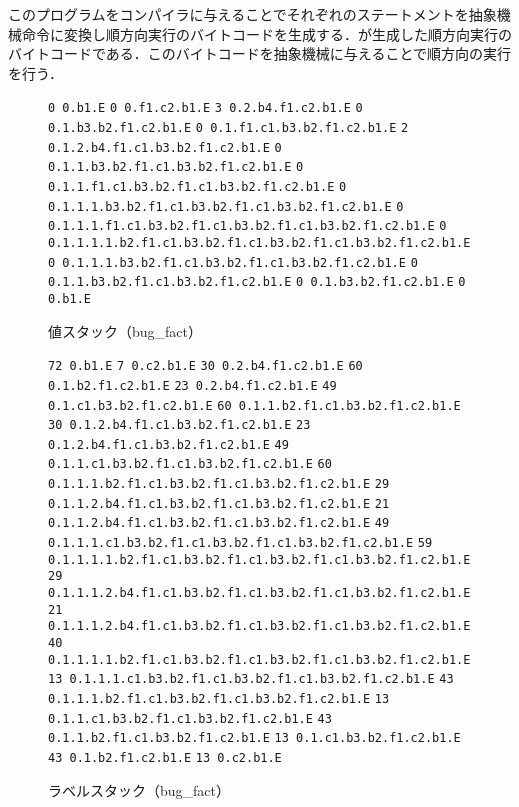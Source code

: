 \documentclass[submit,PRO]{ipsj}
\def\|{\verb|}
\begin{document}
このプログラムをコンパイラに与えることでそれぞれのステートメントを抽象機械命令に変換し順方向実行のバイトコードを生成する．が生成した順方向実行のバイトコードである．このバイトコードを抽象機械に与えることで順方向の実行を行う．

\begin{figure}[tb]
\vbox{
\hbox{\|0 0.b1.E|}
\hbox{\|0 0.f1.c2.b1.E|}
\hbox{\|3 0.2.b4.f1.c2.b1.E|}
\hbox{\|0 0.1.b3.b2.f1.c2.b1.E|}
\hbox{\|0 0.1.f1.c1.b3.b2.f1.c2.b1.E|}
\hbox{\|2 0.1.2.b4.f1.c1.b3.b2.f1.c2.b1.E|}
\hbox{\|0 0.1.1.b3.b2.f1.c1.b3.b2.f1.c2.b1.E|}
\hbox{\|0 0.1.1.f1.c1.b3.b2.f1.c1.b3.b2.f1.c2.b1.E|}
\hbox{\|0 0.1.1.1.b3.b2.f1.c1.b3.b2.f1.c1.b3.b2.f1.c2.b1.E|}
\hbox{\|0 0.1.1.1.f1.c1.b3.b2.f1.c1.b3.b2.f1.c1.b3.b2.f1.c2.b1.E|}
\hbox{\|0 0.1.1.1.1.b2.f1.c1.b3.b2.f1.c1.b3.b2.f1.c1.b3.b2.f1.c2.b1.E|}
\hbox{\|0 0.1.1.1.b3.b2.f1.c1.b3.b2.f1.c1.b3.b2.f1.c2.b1.E|}
\hbox{\|0 0.1.1.b3.b2.f1.c1.b3.b2.f1.c2.b1.E|}
\hbox{\|0 0.1.b3.b2.f1.c2.b1.E|}
\hbox{\|0 0.b1.E|}
}
\centerline{}
\caption{値スタック（bug\_fact）}
\label{fig:value}
\end{figure}

\begin{figure}[tb]
\vbox{
\hbox{\|72 0.b1.E|}
\hbox{\|7 0.c2.b1.E|}
\hbox{\|30 0.2.b4.f1.c2.b1.E|}
\hbox{\|60 0.1.b2.f1.c2.b1.E|}
\hbox{\|23 0.2.b4.f1.c2.b1.E|}
\hbox{\|49 0.1.c1.b3.b2.f1.c2.b1.E|}
\hbox{\|60 0.1.1.b2.f1.c1.b3.b2.f1.c2.b1.E|}
\hbox{\|30 0.1.2.b4.f1.c1.b3.b2.f1.c2.b1.E|}
\hbox{\|23 0.1.2.b4.f1.c1.b3.b2.f1.c2.b1.E|}
\hbox{\|49 0.1.1.c1.b3.b2.f1.c1.b3.b2.f1.c2.b1.E|}
\hbox{\|60 0.1.1.1.b2.f1.c1.b3.b2.f1.c1.b3.b2.f1.c2.b1.E|}
\hbox{\|29 0.1.1.2.b4.f1.c1.b3.b2.f1.c1.b3.b2.f1.c2.b1.E|}
\hbox{\|21 0.1.1.2.b4.f1.c1.b3.b2.f1.c1.b3.b2.f1.c2.b1.E|}
\hbox{\|49 0.1.1.1.c1.b3.b2.f1.c1.b3.b2.f1.c1.b3.b2.f1.c2.b1.E|}
\hbox{\|59 0.1.1.1.1.b2.f1.c1.b3.b2.f1.c1.b3.b2.f1.c1.b3.b2.f1.c2.b1.E|}
\hbox{\|29 0.1.1.1.2.b4.f1.c1.b3.b2.f1.c1.b3.b2.f1.c1.b3.b2.f1.c2.b1.E|}
\hbox{\|21 0.1.1.1.2.b4.f1.c1.b3.b2.f1.c1.b3.b2.f1.c1.b3.b2.f1.c2.b1.E|}
\hbox{\|40 0.1.1.1.1.b2.f1.c1.b3.b2.f1.c1.b3.b2.f1.c1.b3.b2.f1.c2.b1.E|}
\hbox{\|13 0.1.1.1.c1.b3.b2.f1.c1.b3.b2.f1.c1.b3.b2.f1.c2.b1.E|}
\hbox{\|43 0.1.1.1.b2.f1.c1.b3.b2.f1.c1.b3.b2.f1.c2.b1.E|}
\hbox{\|13 0.1.1.c1.b3.b2.f1.c1.b3.b2.f1.c2.b1.E|}
\hbox{\|43 0.1.1.b2.f1.c1.b3.b2.f1.c2.b1.E|}
\hbox{\|13 0.1.c1.b3.b2.f1.c2.b1.E|}
\hbox{\|43 0.1.b2.f1.c2.b1.E|}
\hbox{\|13 0.c2.b1.E|}
}
\centerline{}
\caption{ラベルスタック（bug\_fact）}
\label{fig:label}
\end{figure}
\end{document}
